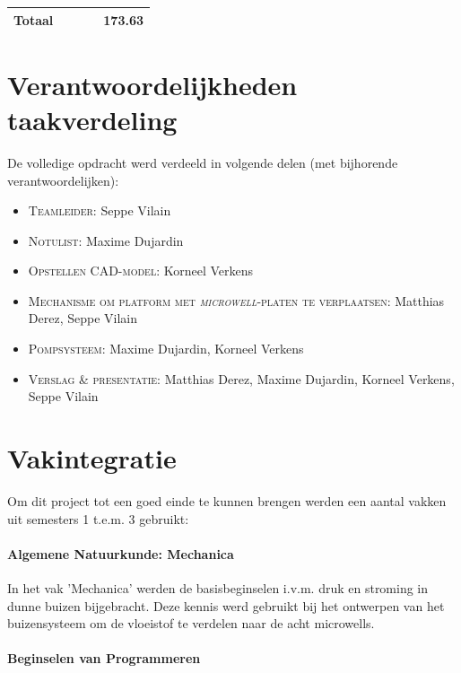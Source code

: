 \documentclass[a4paper,twoside,kulak]{kulakreport} %
\begin{document}
\begin{table}[!hbt]
\begin{tabular}{|p{1cm}|p{5cm}|p{2cm}|p{2cm}|p{2cm}|}
		\bottomrule
		
		Totaal & & & & 173.63 \\
		\bottomrule
	\end{tabular}
	\label{tab:financieelVerslag}

	
\end{table}


\clearpage

\section*{Verantwoordelijkheden taakverdeling}

De volledige opdracht werd verdeeld in volgende delen (met bijhorende verantwoordelijken):
\begin{itemize}
	\item \textsc{Teamleider:} Seppe Vilain
	\item \textsc{Notulist}: Maxime Dujardin
	\item \textsc{Opstellen CAD-model}: Korneel Verkens
	\item \textsc{Mechanisme om platform met \textit{microwell}-platen te verplaatsen:} Matthias Derez, Seppe Vilain
	\item \textsc{Pompsysteem:} Maxime Dujardin, Korneel Verkens
	\item \textsc{Verslag \& presentatie:} Matthias Derez, Maxime Dujardin, Korneel Verkens, Seppe Vilain
	
\end{itemize}

\clearpage

\section*{Vakintegratie}
Om dit project tot een goed einde te kunnen brengen werden een aantal vakken uit semesters 1 t.e.m. 3 gebruikt:

\paragraph{Algemene Natuurkunde: Mechanica}

In het vak 'Mechanica' werden de basisbeginselen i.v.m. druk en stroming in dunne buizen bijgebracht. Deze kennis werd gebruikt bij het ontwerpen van het buizensysteem om de vloeistof te verdelen naar de acht microwells.

\paragraph{Beginselen van Programmeren}
\end{document}
